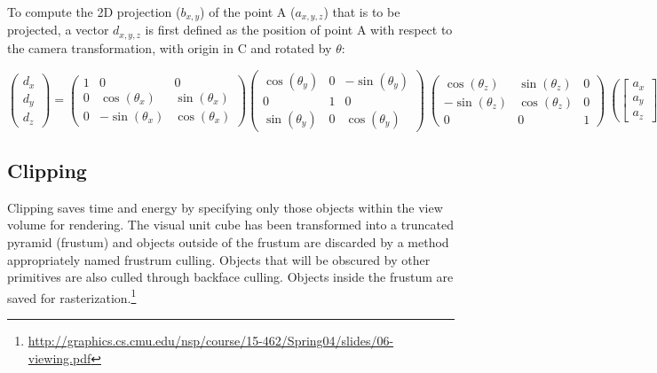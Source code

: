 \documentclass{article}
\begin{document}
To compute the 2D projection ($b_{x, y}$) of the point A ($a_{x, y, z}$) that is to be projected, a vector $d_{x, y, z}$ is first defined as the position of point A with respect to the camera transformation, with origin in C and rotated by $\theta$:

\[\begin{pmatrix}
  d_{x} \\
  d_{y} \\
  d_{z} 
 \end{pmatrix}
=
\begin{pmatrix}
  1 & 0 & 0 \\
  0 & \cos(\theta_{x}) & \sin(\theta_{x}) \\
  0 &  -\sin(\theta_{x}) & \cos(\theta_{x}) 
 \end{pmatrix}
\begin{pmatrix}
  \cos(\theta_{y}) & 0 & -\sin(\theta_{y}) \\
  0 & 1 & 0 \\
  \sin(\theta_{y}) & 0  & \cos(\theta_{y}) 
 \end{pmatrix}\
\begin{pmatrix}
  \cos(\theta_{z}) & \sin(\theta_{z})  & 0  \\
  -\sin(\theta_{z}) & \cos(\theta_{z}) & 0 \\
  0 & 0  & 1 
 \end{pmatrix}\
\left(
\begin{bmatrix}
  a_{x} \\
  a_{y} \\
  a_{z} 
\end{bmatrix}\
-
\begin{bmatrix}
  c_{x} \\
  c_{y} \\
  c_{z} 
\end{bmatrix}\
\right)\]

\subsection{Clipping}
Clipping saves time and energy by specifying only those objects within the view volume for rendering. The visual unit cube has been transformed into a truncated pyramid (frustum) and objects outside of the frustum are discarded by a method appropriately named frustrum culling. Objects that will be obscured by other primitives are also culled through backface culling. Objects inside the frustum are saved for rasterization.\footnote{\url{http://graphics.cs.cmu.edu/nsp/course/15-462/Spring04/slides/06-viewing.pdf}}
\end{document}
